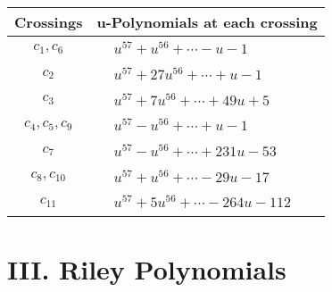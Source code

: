 \documentclass[1p]{elsarticle_modified}
\theoremstyle{definition}
\begin{document}
\begin{tabular}{m{50pt}|m{274pt}}
Crossings & \hspace{64pt}u-Polynomials at each crossing \\
\hline $$\begin{aligned}c_{1},c_{6}\end{aligned}$$&$\begin{aligned}
&u^{57}+u^{56}+\cdots- u-1
\end{aligned}$\\
\hline $$\begin{aligned}c_{2}\end{aligned}$$&$\begin{aligned}
&u^{57}+27 u^{56}+\cdots+u-1
\end{aligned}$\\
\hline $$\begin{aligned}c_{3}\end{aligned}$$&$\begin{aligned}
&u^{57}+7 u^{56}+\cdots+49 u+5
\end{aligned}$\\
\hline $$\begin{aligned}c_{4},c_{5},c_{9}\end{aligned}$$&$\begin{aligned}
&u^{57}- u^{56}+\cdots+u-1
\end{aligned}$\\
\hline $$\begin{aligned}c_{7}\end{aligned}$$&$\begin{aligned}
&u^{57}- u^{56}+\cdots+231 u-53
\end{aligned}$\\
\hline $$\begin{aligned}c_{8},c_{10}\end{aligned}$$&$\begin{aligned}
&u^{57}+u^{56}+\cdots-29 u-17
\end{aligned}$\\
\hline $$\begin{aligned}c_{11}\end{aligned}$$&$\begin{aligned}
&u^{57}+5 u^{56}+\cdots-264 u-112
\end{aligned}$\\
\hline
\end{tabular}\newpage\renewcommand{\arraystretch}{1}
\centering \section*{ III. Riley Polynomials}
\end{document}
